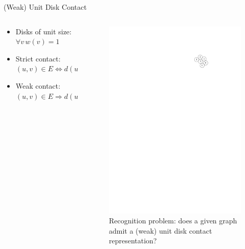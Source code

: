 \documentclass[aspectratio=169,notes]{beamer}
\begin{document}
\begin{frame}{(Weak) Unit Disk Contact}


\begin{columns}
\begin{column}{0.5\textwidth}
    \begin{itemize}
        \item Disks of unit size: $\forall v\,w(v) = 1$
        \item Strict contact: $(u, v) \in E \Longleftrightarrow d(u) \text{ touches } d(v)$
        \item Weak contact: $(u, v) \in E \Longrightarrow d(u) \text{ touches } d(v)$
    \end{itemize}
\end{column}
\begin{column}{0.4\textwidth}
\begin{figure}
    \centering
    \includegraphics{ch1_introduction_3.pdf}
    \caption*{Recognition problem: does a given graph admit a (weak) unit disk contact representation?}
\end{figure}
\end{column}
\end{columns}


\end{frame}
\end{document}
